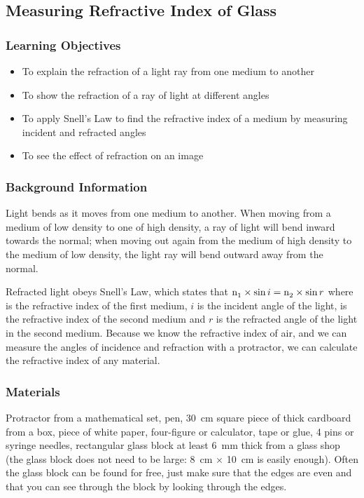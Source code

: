 \subsection{Measuring Refractive Index of Glass}

\subsubsection*{Learning Objectives}
\begin{itemize}
\item{To explain the refraction of a light ray from one medium to another} 
\item{To show the refraction of a ray of light at different angles} 
\item{To apply Snell's Law to find the refractive index of a medium by measuring incident and refracted angles} 
\item{To see the effect of refraction on an image} 
\end{itemize}

\subsubsection*{Background Information}
Light bends as it moves from one medium to another. When moving from a medium of low density to one of high density, a ray of light will bend inward towards the normal; when moving out again from the medium of high density to the medium of low density, the light ray will bend outward away from the normal.

Refracted light obeys Snell's Law, which states that $\ce{n1} \times \sin i = \ce{n2} \times \sin r$ where  is the refractive index of the first medium, $i$ is the incident angle of the light,  is the refractive index of the second medium and $r$ is the refracted angle of the light in the second medium. Because we know the refractive index of air, and we can measure the angles of incidence and refraction with a protractor, we can calculate the refractive index of any material.  

\subsubsection*{Materials}
Protractor from a mathematical set, pen, 30~cm square piece of thick cardboard from a box, piece of white paper, four-figure or calculator, tape or glue, 4 pins or syringe needles, rectangular glass block at least 6~mm thick from a glass shop (the glass block does not need to be large: 8~cm $\times$ 10~cm is easily enough). Often the glass block can be found for free, just make sure that the edges are even and that you can see through the block by looking through the edges.  

